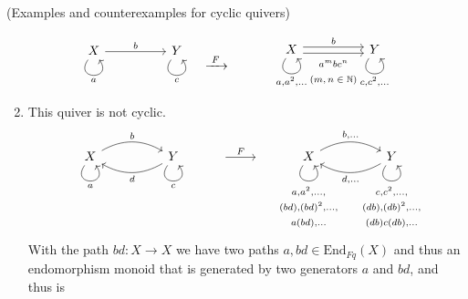 \begin{example}{(Examples and counterexamples for cyclic quivers)}
\begin{enumerate}
\[
\begin{minipage}{.10\textwidth}
\phantom{}
\end{minipage}
\begin{minipage}{.30\textwidth}
\begin{tikzcd}
{X} \arrow["a"', loop, distance=2em, in=305, out=235] \arrow[rr, "b"] &  & {Y} \arrow["c"', loop, distance=2em, in=305, out=235]
\end{tikzcd}
\end{minipage}
%
\begin{minipage}{.15\textwidth}
$\xrightarrow{\text{     }F\text{     }}$
\end{minipage}
%
\begin{minipage}{.35\textwidth}
\begin{tikzcd}
{X} \arrow["{a,a^{2},\dots}"', loop, distance=2em, in=305, out=235] \arrow[rr, "b", shift left] \arrow[rr, "{\begin{matrix} \text{$a^{m}bc^{n}$}
\\ \text{$(m,n\in\mathbb{N})$} \end{matrix}}"', shift right] &  & {Y} \arrow["{c,c^{2},\dots}"', loop, distance=2em, in=305, out=235]
\end{tikzcd}
\end{minipage}
%
\begin{minipage}{.10\textwidth}
\phantom{}
\end{minipage}
\]
\item This quiver is not cyclic.
\[
\begin{tikzcd}
X \arrow["a"', loop, distance=2em, in=305, out=235] \arrow[rr, "b", bend left] &  & Y \arrow["c"', loop, distance=2em, in=305, out=235] \arrow[ll, "d", bend left] & {} \arrow[r, "F"] & {} & X \arrow["{\begin{matrix}a,a^{2},\dots, \\ (bd),(bd)^{2},\dots, \\ a(bd),\dots \end{matrix}}"', loop, distance=2em, in=305, out=235] \arrow[rr, "{b,\dots}", bend left] &  & Y \arrow[ll, "{d,\dots}", bend left] \arrow["{\begin{matrix} c,c^{2},\dots, \\(db),(db)^{2},\dots, \\ (db)c(db),\dots \end{matrix}}"', loop, distance=2em, in=305, out=235]
\end{tikzcd}
\]
With the path $bd : X \rightarrow X$ we have two paths
$a, bd \in \mathrm{End}_{Fq}(X)$ and thus an endomorphism monoid that is generated by two generators $a$ and $bd$, and thus is

\end{enumerate}
\end{example}
